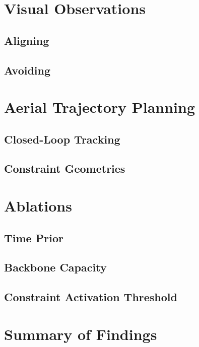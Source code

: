 \documentclass[headsepline,footsepline,footinclude=false,oneside,fontsize=11pt,paper=a4,listof=totoc,bibliography=totoc]{scrbook}
\begin{document}
\section{Visual Observations}\label{sec:res:visual}
\subsection{Aligning}\label{sec:res:visual:aligning}
\subsection{Avoiding}\label{sec:res:visual:avoiding}

\section{Aerial Trajectory Planning}\label{sec:res:uav}
\subsection{Closed-Loop Tracking}\label{sec:res:uav:tracking}
\subsection{Constraint Geometries}\label{sec:res:uav:geometries}

\section{Ablations}\label{sec:res:ablation}
\subsection{Time Prior}\label{sec:res:ablation:time}
\subsection{Backbone Capacity}\label{sec:res:ablation:capacity}
\subsection{Constraint Activation Threshold}\label{sec:res:ablation:threshold}

\section{Summary of Findings}\label{sec:res:summary}

\end{document}
